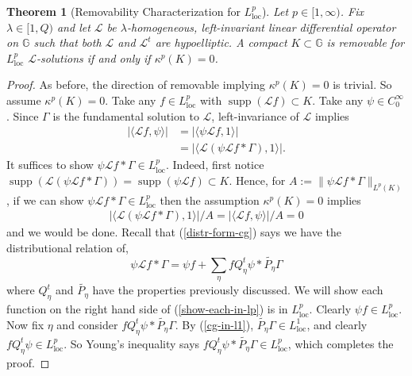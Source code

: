 \documentclass[12pt,a4paper,reqno]{amsart}
\DeclareMathOperator{\supp}{supp}
\newcommand{\wt}{\widetilde}
\newcommand{\cg}{\Gamma}
\renewcommand{\L}{\mathcal{L}}
\renewcommand{\k}{\kappa}
\renewcommand{\l}{\lambda}
\newcommand{\G}{\mathbb{G}}
\numberwithin{equation}{section}
\newtheorem{thm}{Theorem}[section]
\theoremstyle{definition}
\begin{document}
\begin{thm}[Removability Characterization for $L^p_{\text{loc}}$]
Let $p \in [1, \infty)$. Fix $\l \in [1,Q)$ and let $\L$ be $\l$-homogeneous, left-invariant linear differential operator on $\G$ such that both $\L$ and $\L^t$ are hypoelliptic. A compact $K \subset \G$ is removable for $L^p_{\text{loc}}$ $\L$-solutions if and only if $\k^p(K) = 0$.
\end{thm}
\begin{proof}
As before, the direction of removable implying $\k^p(K) = 0$ is trivial. So assume $\k^p(K) = 0$. Take any $f \in L^p_{\text{loc}}$ with $\supp(\L f)\subset K$. Take any $\psi \in C_0^{\infty}$. Since $\cg$ is the fundamental solution to $\L$, left-invariance of $\L$ implies \begin{align}
|\langle \L f, \psi \rangle| &= |\langle \psi \L f, 1 \rangle | \nonumber \\ &= \left| \langle \L (\psi \L f \ast \cg), 1 \rangle \right|. \nonumber
\end{align}
It suffices to show $\psi \L f \ast \cg \in L^p_{\text{loc}}$. Indeed, first notice $\supp( \L (\psi \L f \ast \cg)) = \supp(\psi \L f) \subset K$. Hence, for $A := \| \psi \L f \ast \cg\|_{L^p(K)}$, if we can show $\psi \L f \ast \cg \in L_{\text{loc}}^p$ then the assumption $\k^p(K) = 0$ implies \begin{align*}
     |\langle \L (\psi \L f  \ast \cg), 1 \rangle |/A = |\langle \L f, \psi \rangle| /A = 0
\end{align*}
and we would be done. Recall that (\ref{distr-form-cg}) says we have the distributional relation of, \begin{equation}\label{show-each-in-lp}
\psi \L f \ast \cg = \psi f + \sum_{\eta} f Q_{\eta}^t \psi \ast \wt{P_{\eta}} \cg 
\end{equation}
where $Q_{\eta}^t$ and $\wt{P_{\eta}}$ have the properties previously discussed. We will show each function on the right hand side of (\ref{show-each-in-lp}) is in $L^p_{\text{loc}}$. Clearly $\psi f \in L^p_{\text{loc}}$. Now fix $\eta$ and consider $f Q_{\eta}^t\psi \ast \wt{P_{\eta}}\cg$. By (\ref{cg-in-l1}), $\wt{P_{\eta}} \cg \in L^1_{\text{loc}}$, and clearly $f Q_{\eta}^t \psi \in L^p_{\text{loc}}$. So Young's inequality says $f Q_{\eta}^t \psi \ast \wt{P_{\eta}} \cg \in L^p_{\text{loc}}$, which completes the proof.
\end{proof}



\printbibliography
\end{document}

